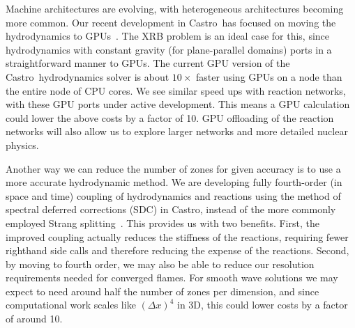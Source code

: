 \documentclass[a4paper]{jpconf}
\newcommand{\castro}{{\sffamily Castro}}
\begin{document}
Machine architectures are evolving, with heterogeneous architectures
becoming more common.  Our recent development in \castro\ has focused
on moving the hydrodynamics to GPUs~\cite{astronum:2017}.  The XRB
problem is an ideal case for this, since hydrodynamics with constant
gravity (for plane-parallel domains) ports in a straightforward manner
to GPUs.  The current GPU version of the \castro\ hydrodynamics solver
is about $10\times$ faster using GPUs on a node than the entire node
of CPU cores.  We see similar speed ups with reaction networks, with
these GPU ports under active development.  This means a GPU
calculation could lower the above costs by a factor of 10.  GPU
offloading of the reaction networks will also allow us to explore
larger networks and more detailed nuclear physics.

Another way we can reduce the number of zones for given accuracy is to use a more
accurate hydrodynamic method.  We are developing fully
fourth-order (in space and time) coupling of hydrodynamics and
reactions using the method of spectral deferred corrections (SDC) in
\castro, instead of the more commonly employed Strang splitting~\cite{strang:1968}.  This
provides us with two benefits.  First, the improved coupling actually
reduces the stiffness of the reactions, requiring fewer righthand side
calls and therefore reducing the expense of the
reactions.  Second, by moving to fourth
order, we may also be able to reduce our resolution requirements
needed for converged flames. For smooth wave solutions we may expect to need
around half the number of zones per dimension, and since computational work
scales like $(\Delta x)^4$ in 3D, this could lower costs by a factor of around
10.
%
%
\end{document}
